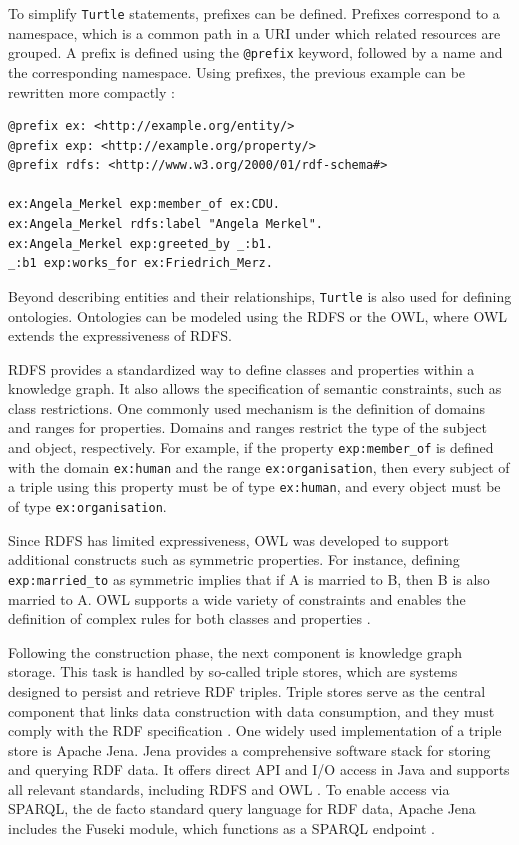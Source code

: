 \documentclass[a4paper,oneside,bibliography=totoc]{scrbook}
\begin{document}
\pagebreak

To simplify \texttt{Turtle} statements, prefixes can be defined. Prefixes correspond to a namespace, which is a common path in a \ac{URI} under which related resources are grouped. A prefix is defined using the \texttt{@prefix} keyword, followed by a name and the corresponding namespace. Using prefixes, the previous example can be rewritten more compactly \cite{Tomaszuk2020}:

\begin{lstlisting}[language=Turtle, caption=Example of a Knowledge Graph in \texttt{Turtle} Format with Prefixes, label=lst:turtle_example]
@prefix ex: <http://example.org/entity/>
@prefix exp: <http://example.org/property/>
@prefix rdfs: <http://www.w3.org/2000/01/rdf-schema#>

ex:Angela_Merkel exp:member_of ex:CDU.
ex:Angela_Merkel rdfs:label "Angela Merkel".
ex:Angela_Merkel exp:greeted_by _:b1.
_:b1 exp:works_for ex:Friedrich_Merz.
\end{lstlisting}

Beyond describing entities and their relationships, \texttt{Turtle} is also used for defining ontologies. Ontologies can be modeled using the \ac{RDFS} or the \ac{OWL}, where OWL extends the expressiveness of RDFS.

\ac{RDFS} provides a standardized way to define classes and properties within a knowledge graph. It also allows the specification of semantic constraints, such as class restrictions. One commonly used mechanism is the definition of domains and ranges for properties. Domains and ranges restrict the type of the subject and object, respectively. For example, if the property \texttt{exp:member\_of} is defined with the domain \texttt{ex:human} and the range \texttt{ex:organisation}, then every subject of a triple using this property must be of type \texttt{ex:human}, and every object must be of type \texttt{ex:organisation}.

Since \ac{RDFS} has limited expressiveness, \ac{OWL} was developed to support additional constructs such as symmetric properties. For instance, defining \texttt{exp:married\_to} as symmetric implies that if A is married to B, then B is also married to A. \ac{OWL} supports a wide variety of constraints and enables the definition of complex rules for both classes and properties \cite{VillazonTerrazas2017}.

Following the construction phase, the next component is knowledge graph storage. This task is handled by so-called triple stores, which are systems designed to persist and retrieve RDF triples. Triple stores serve as the central component that links data construction with data consumption, and they must comply with the \ac{RDF} specification \cite{Rusher2003}. One widely used implementation of a triple store is Apache Jena. Jena provides a comprehensive software stack for storing and querying RDF data. It offers direct API and I/O access in Java and supports all relevant standards, including \ac{RDFS} and \ac{OWL} \cite{Carroll2004}. To enable access via \ac{SPARQL}, the de facto standard query language for RDF data, Apache Jena includes the Fuseki module, which functions as a \ac{SPARQL} endpoint \cite{Chokshi2022}.
\end{document}
